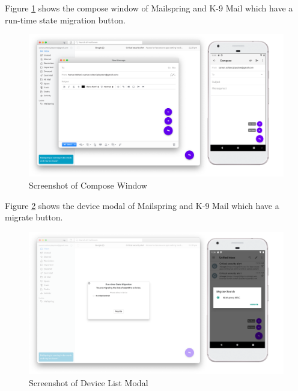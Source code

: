 Figure \ref{fig:adapt-compose} shows the compose window of Mailspring and K-9 Mail which have a run-time state migration button.

\FloatBarrier
\begin{figure}[H]
    \includegraphics[width=\linewidth]{../figures/adapt-compose.png}
    \centering
    \caption{Screenshot of Compose Window}
    \label{fig:adapt-compose}
\end{figure}
\FloatBarrier

Figure \ref{fig:adapt-modal} shows the device modal of Mailspring and K-9 Mail which have a migrate button.

\FloatBarrier
\begin{figure}[H]
    \includegraphics[width=\linewidth]{../figures/adapt-modal.png}
    \centering
    \caption{Screenshot of Device List Modal}
    \label{fig:adapt-modal}
\end{figure}
\FloatBarrier


